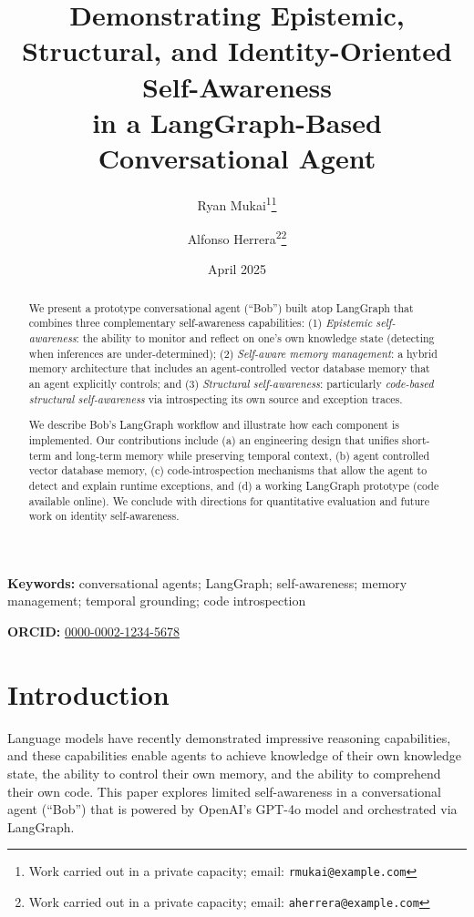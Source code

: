 \documentclass[11pt]{article}
\title{Demonstrating Epistemic, Structural, and Identity-Oriented Self-Awareness \\in a LangGraph-Based Conversational Agent}
\author{
  Ryan Mukai\textsuperscript{1}\thanks{Work carried out in a private capacity; email: \texttt{rmukai@example.com}} 
  \and
  Alfonso Herrera\textsuperscript{2}\thanks{Work carried out in a private capacity; email: \texttt{aherrera@example.com}}
}
\date{April 2025}
\begin{document}
\maketitle

\begin{abstract}
We present a prototype conversational agent (“Bob”) built atop LangGraph that combines three complementary self-awareness capabilities:
(1) \emph{Epistemic self-awareness}: the ability to monitor and reflect on one’s own knowledge state (detecting when inferences are under-determined);
(2) \emph{Self-aware memory management}: a hybrid memory architecture that includes an agent-controlled vector database memory that an agent explicitly controls; and
(3) \emph{Structural self-awareness}: particularly \emph{code-based structural self-awareness} via introspecting its own source and exception traces.

We describe Bob’s LangGraph workflow and illustrate how each component is implemented. Our contributions include (a) an engineering design that unifies short-term and long-term memory while preserving temporal context, (b) agent controlled vector database memory, (c) code-introspection mechanisms that allow the agent to detect and explain runtime exceptions, and (d) a working LangGraph prototype (code available online). We conclude with directions for quantitative evaluation and future work on identity self-awareness.
\end{abstract}

\textbf{Keywords:} conversational agents; LangGraph; self-awareness; memory management; temporal grounding; code introspection

\vspace{1em}
\noindent\textbf{ORCID:} \href{https://orcid.org/0000-0002-1234-5678}{0000-0002-1234-5678}

\section{Introduction}
Language models have recently demonstrated impressive reasoning capabilities, and these capabilities enable agents to achieve knowledge of their own knowledge state, the ability to control their own memory, and the ability to comprehend their own code. This paper explores limited self-awareness in a conversational agent (“Bob”) that is powered by OpenAI’s GPT-4o model and orchestrated via LangGraph.
\end{document}
